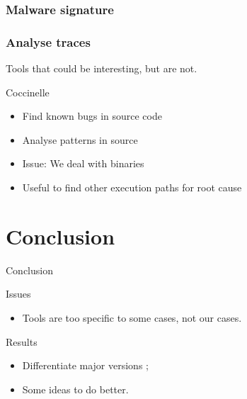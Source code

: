 \documentclass[11pt]{beamer}
\begin{document}
\begin{frame}
    \frametitle{Malware signature}
    
\end{frame}

\begin{frame}
    \frametitle{Analyse traces} 
\end{frame}


\begin{frame}{Tools that could be interesting, but are not.}

\begin{block}{Coccinelle}
	\begin{itemize}
		\item Find known bugs in source code
		\item Analyse patterns in source
		\item Issue: We deal with binaries
		\item Useful to find other execution paths for root cause
	\end{itemize}
\end{block}

\end{frame}



\section{Conclusion}


\begin{frame}{Conclusion}

	\begin{block}{Issues}
		\begin{itemize}
			\item Tools are too specific to some cases, not our cases.
		\end{itemize}
	\end{block}

	\begin{block}{Results}
		\begin{itemize}
			\item Differentiate major versions ;
            \item Some ideas to do better.
		\end{itemize}
	\end{block}
\end{frame}
\end{document}
